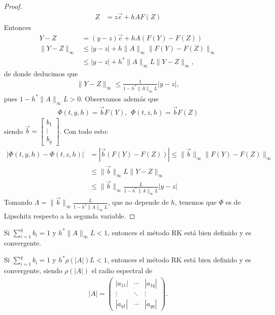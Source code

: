 \begin{proof}
\begin{align*}
        Z & = z\overrightarrow{e} + hAF(Z)
    \end{align*}
    Entonces
    \begin{align*}
        Y - Z            & = (y-z)\overrightarrow{e} + hA(F(Y) - F(Z))         \\
        \|Y-Z\|_{\infty} & \leq |y-z| + h\|A\|_{\infty}\|F(Y) -F(Z)\|_{\infty} \\
                         & \leq |y-z| + h^*\|A\|_{\infty}L\|Y-Z\|_{\infty},
    \end{align*}
    de donde deducimos que
    \begin{align*}
        \|Y-Z\|_{\infty} \leq \frac{1}{1 - h^*\|A\|_{\infty}L}|y-z|,
    \end{align*}
    pues $1 - h^*\|A\|_{\infty}L > 0$. Observamos además que
    \begin{align*}
        \Phi(t,y,h) = \overrightarrow{b}F(Y), \ \ \Phi(t,z,h) = \overrightarrow{b}F(Z)
    \end{align*}
    siendo $\overrightarrow{b} = \begin{bmatrix}
            b_1    \\
            \vdots \\
            b_q
        \end{bmatrix}$. Con todo esto:
    \begin{align*}
        |\Phi(t,y,h) - \Phi(t,z,h)| & = |\overrightarrow{b}(F(Y) - F(Z))| \leq \|\overrightarrow{b}\|_{\infty}\|F(Y) - F(Z)\|_{\infty} \\
                                    & \leq \|\overrightarrow{b}\|_{\infty}L\|Y-Z\|_{\infty}                                            \\
                                    & \leq \|\overrightarrow{b}\|_{\infty} \frac{L}{1 - h^*\|A\|_{\infty}L}|y-z|
    \end{align*}
    Tomando $\Lambda = \|\overrightarrow{b}\|_{\infty} \frac{L}{1 - h^*\|A\|_{\infty}L}$, que no depende de $h$, tenemos que $\Phi$ es de Lipschitz respecto a la segunda variable.
\end{proof}

\begin{cor}
    Si $\sum_{i=1}^{q} b_i = 1$ y $h^* \|A\|_{\infty}L < 1$, entonces el método RK está bien definido y es convergente.
\end{cor}

\begin{cor}
    Si $\sum_{i=1}^{q} b_i = 1$ y $h^* \rho(|A|)L < 1$, entonces el método RK está bien definido y es convergente, siendo $\rho(|A|)$ el radio espectral de
    \begin{align*}
        |A| = \begin{pmatrix}
                  |a_{11}| & \cdots & |a_{1q}| \\
                  \vdots   & \ddots & \vdots   \\
                  |a_{q1}| & \cdots & |a_{qq}|
              \end{pmatrix}.
    \end{align*}
\end{cor}

